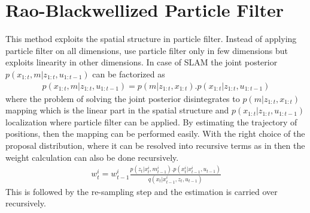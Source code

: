 \section{Rao-Blackwellized Particle Filter}
 This method exploits the spatial structure in particle filter. Instead of applying particle filter on all dimensions, use particle filter only in few dimensions but exploits linearity in other dimensions. In case of SLAM the joint posterior $p(x_{1:t}, m | z_{1:t}, u_{1:t-1})$ can be factorized as 
\begin{gather} \label{RAoB}
    p(x_{1:t}, m | z_{1:t}, u_{1:t-1}) = p(m | z_{1:t}, x_{1:t}).p(x_{1:t} | z_{1:t}, u_{1:t-1})
\end{gather}
where the problem of solving the joint posterior disintegrates to $p(m | z_{1:t}, x_{1:t})$ mapping which is the linear part in the spatial structure and $p(x_{1:t} | z_{1:t}, u_{1:t-1})$ localization where particle filter can be applied. By estimating the trajectory of positions, then the mapping can be performed easily. With the right choice of the proposal distribution, where it can be resolved into recursive terms as in  then the weight calculation can also be done recursively.
\begin{gather} \label{RaoB_weight}
    w_{t}^{i} = w_{t-1}^{i} \frac{p(z_{t}|x_{t}^{i}, m_{t-1}^{i}). p(x_{t}^{i}|x_{t-1}^{i}, u_{t-1})}{q(x_t|x_{t-1}^{i},z_{t}, u_{t-1})}
\end{gather}
This is followed by the re-sampling step and the estimation is carried over recursively.
